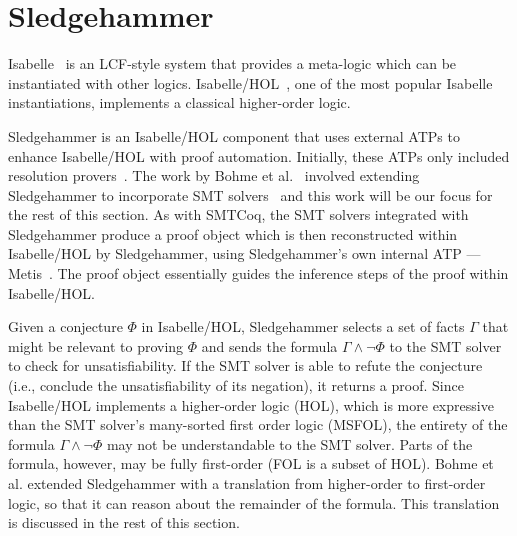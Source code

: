 \documentclass{article}
\begin{document}
	
\section{Sledgehammer}
\label{sec:hammer}
	Isabelle~\cite{DBLP:journals/corr/cs-LO-9301106} 
	is an LCF-style system that 
	provides a meta-logic which can be 
	instantiated with other logics.
	Isabelle/HOL~\cite{10.5555/1791547}, 
	one of the most popular Isabelle 
	instantiations, implements a 
	classical higher-order logic. 
	
	Sledgehammer is
	an Isabelle/HOL component that 
	uses external ATPs to enhance 
	Isabelle/HOL with proof 
	automation. Initially, these 
	ATPs only included resolution 
	provers~\cite{10.1007/978-3-642-39799-8_1}.
	The work by Bohme et 
	al.~\cite{bohme} involved 
	extending Sledgehammer to 
	incorporate SMT
	solvers~\cite{Barrett2018} and this 
	work will be our focus for the 
	rest of this section. As with 
	SMTCoq, the SMT solvers integrated
	with Sledgehammer produce a 
	proof object which is 
	then reconstructed within
	Isabelle/HOL by Sledgehammer, 
	using Sledgehammer's own internal 
	ATP --- Metis~\cite{hurd2003d}. The 
	proof object essentially guides 
	the inference steps of the proof 
	within Isabelle/HOL.
	
	Given a conjecture $\Phi$ in 
	Isabelle/HOL, Sledgehammer 
	selects a set of facts 
	$\Gamma$ that might be relevant 
	to proving $\Phi$ and sends
	the formula $\Gamma \land \neg 
	\Phi$ to the SMT solver to check 
	for unsatisfiability. If the SMT 
	solver is able to refute the 
	conjecture (i.e., conclude 
	the unsatisfiability of its 
	negation), it returns 
	a proof. Since Isabelle/HOL 
	implements a higher-order logic 
	(HOL), which 
	is more expressive than 
	the SMT solver's many-sorted
	first order logic (MSFOL),
	the entirety of the formula
	$\Gamma \land \neg \Phi$ may not 
	be understandable to the SMT 
	solver. Parts of the formula,
	however, may be fully 
	first-order (FOL is 
	a subset of HOL). Bohme et al.
	extended Sledgehammer with 
	a translation from higher-order 
	to first-order logic, so that 
	it can reason about the remainder
	of the formula. This translation
	is discussed in the rest of this 
	section.
	
\end{document}
